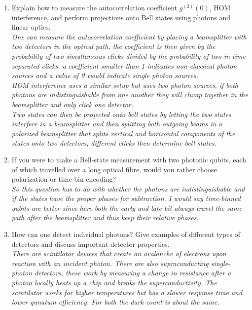 \documentclass[a4paper]{scrartcl}
\newcommand{\qa}[2]{#1\\ \textit{#2}}
\begin{document}
\begin{enumerate}[label=(\alph*)]
  \item \qa{Explain how to measure the autocorrelation coefficient $g^{(2)}(0)$, HOM interference, and perform projections onto Bell states using photons and linear optics.}{One can measure the autocorrelation coefficient by placing a beamsplitter with two detectors in the optical path, the coefficient is then given by the probability of two simultaneous clicks divided by the probability of two in time separated clicks. a coefficient smaller than 1 indicates non-classical photon sources and a value of 0 would indicate single photon sources.\\ HOM interference uses a similar setup but uses two photon sources, if both photons are indistinguishable from one another they will clump together in the beamsplitter and only click one detector.\\ Two states can then be projected onto bell states by letting the two states interfere in a beamsplitter and then splitting both outgoing beams in a polarized beamsplitter that splits vertical and horizontal components of the states onto two detectors, different clicks then determine bell states.}
  \item \qa{If you were to make a Bell-state measurement with two photonic qubits, each of which travelled over a long optical fibre, would you rather choose polarization or time-bin encoding?}{So this question has to do with whether the photons are indistinguishable and if the states have the proper phases for subtraction. I would say time-binned qubits are better since here both the early and late bit always travel the same path after the beamsplitter and thus keep their relative phases.}
  \item \qa{How can one detect individual photons? Give examples of different types of detectors and discuss important detector properties.}{There are scintilator devices that create an avalanche of electrons upon reaction with an incident photon. There are also supraconducting single-photon detectors, these work by measuring a change in resistance after a photon locally heats up a chip and breaks the superconductivity. The scintilator works for higher temperatures but has a slower response time and lower qunatum efficiency. For both the dark count is about the same. }
\end{enumerate}
\end{document}
